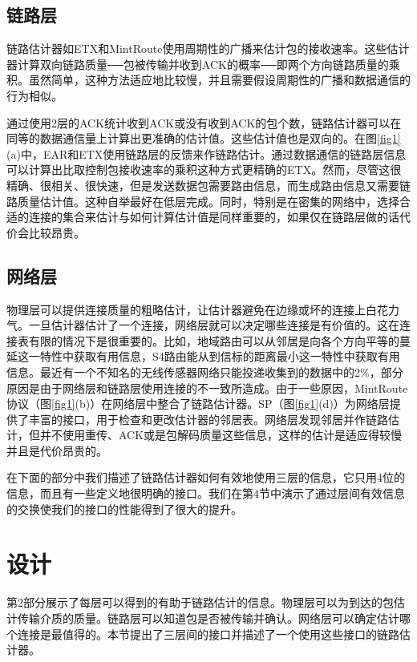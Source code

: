 \documentclass[12pt,a4paper]{article}
\begin{document}
\subsection{链路层}

链路估计器如ETX和MintRoute使用周期性的广播来估计包的接收速率。这些估计器计算双向链路质量──包被传输并收到ACK的概率──即两个方向链路质量的乘积。虽然简单，这种方法适应地比较慢，并且需要假设周期性的广播和数据通信的行为相似。

通过使用2层的ACK统计收到ACK或没有收到ACK的包个数，链路估计器可以在同等的数据通信量上计算出更准确的估计值。这些估计值也是双向的。在图\ref{fig1}(a)中，EAR和ETX使用链路层的反馈来作链路估计。通过数据通信的链路层信息可以计算出比取控制包接收速率的乘积这种方式更精确的ETX。然而，尽管这很精确、很相关、很快速，但是发送数据包需要路由信息，而生成路由信息又需要链路质量估计值。这种自举最好在低层完成。同时，特别是在密集的网络中，选择合适的连接的集合来估计与如何计算估计值是同样重要的，如果仅在链路层做的话代价会比较昂贵。

\subsection{网络层}

物理层可以提供连接质量的粗略估计，让估计器避免在边缘或坏的连接上白花力气。一旦估计器估计了一个连接，网络层就可以决定哪些连接是有价值的。这在连接表有限的情况下是很重要的。比如，地域路由可以从邻居是向各个方向平等的蔓延这一特性中获取有用信息，S4路由能从到信标的距离最小这一特性中获取有用信息。最近有一个不知名的无线传感器网络只能投递收集到的数据中的2\%，部分原因是由于网络层和链路层使用连接的不一致所造成。由于一些原因，MintRoute协议（图\ref{fig1}(b)）在网络层中整合了链路估计器。SP（图\ref{fig1}(d)）为网络层提供了丰富的接口，用于检查和更改估计器的邻居表。网络层发现邻居并作链路估计，但并不使用重传、ACK或是包解码质量这些信息，这样的估计是适应得较慢并且是代价昂贵的。

在下面的部分中我们描述了链路估计器如何有效地使用三层的信息，它只用4位的信息，而且有一些定义地很明确的接口。我们在第4节中演示了通过层间有效信息的交换使我们的接口的性能得到了很大的提升。

\section{设计}

第2部分展示了每层可以得到的有助于链路估计的信息。物理层可以为到达的包估计传输介质的质量。链路层可以知道包是否被传输并确认。网络层可以确定估计哪个连接是最值得的。本节提出了三层间的接口并描述了一个使用这些接口的链路估计器。
\end{document}
